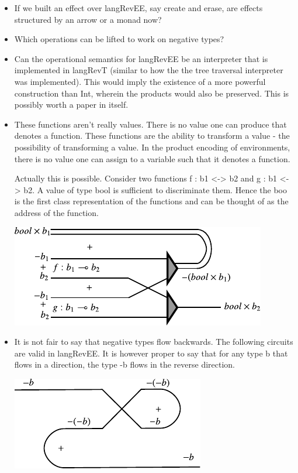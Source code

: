 \documentclass[preprint]{sigplanconf}
\begin{document}
\begin{itemize}

\item If we built an effect over {{langRevEE}}, say {{create}} and
  {{erase}}, are effects structured by an arrow or a monad now?

\item Which operations can be lifted to work on negative types?

\item Can the operational semantics for {{langRevEE}} be an
  interpreter that is implemented in {{langRevT}} (similar to how the
  the tree traversal interpreter was implemented). This would imply
  the existence of a more powerful construction than Int, wherein the
  products would also be preserved. This is possibly worth a paper in
  itself.

\item These functions aren't really values. There is no value one can
  produce that denotes a function. These functions are the ability to
  transform a value - the possibility of transforming a value.  In the
  product encoding of environments, there is no value one can assign
  to a variable such that it denotes a function.


Actually this is possible. Consider two functions {{f : b1 <-> b2}}
and {{g : b1 <-> b2}}. A value of type {{bool}} is sufficient to
discriminate them. Hence the {{boo}} is the first class representation
of the functions and can be thought of as the address of the function. 

\begin{center}
  \includegraphics{diagrams/dispatch.pdf}
\end{center}


\item It is not fair to say that negative types flow backwards. The
  following circuits are valid in {{langRevEE}}. It is however proper
  to say that for any type {{b}} that flows in a direction, the type
  {{-b}} flows in the reverse direction. 

\begin{center}
  \includegraphics{diagrams/neg_circuit1.pdf}
\end{center}


\end{itemize}
\end{document}
